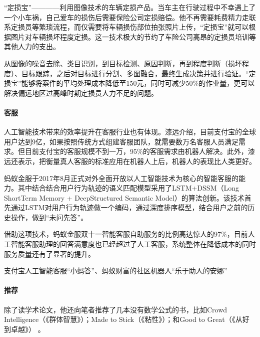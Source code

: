\documentclass[letterpaper,10pt,english]{sphinxmanual}
\begin{document}
“定损宝”————利用图像技术的车辆定损产品。当车主在行驶过程中不幸遇上了一个小车祸，自己爱车的损伤后需要保险公司定损赔偿。他不再需要耗费精力走联系定损员等繁琐流程，而仅需要将车辆损伤部位拍张照片上传，“定损宝”就可以根据图片对车辆损坏程度定损。这一技术极大的节约了车险公司高昂的定损员培训等其他人力的支出。

从图像的噪音去除、类目识别，到目标检测、原因判断，再到程度判断（损坏程度）、目标跟踪，之后对目标进行分割、多图融合，最终生成决策并进行验证。“定损宝”能够将案件的平均处理成本降低至150元，同时可减少50\%的作业量，更可以解决偏远地区过高峰时期定损员人力不足的问题。%
\begin{footnote}[1084]\sphinxAtStartFootnote
{}
%
\end{footnote}


\paragraph{客服}
\label{\detokenize{chapter_AI_expert/qi_yuan:id7}}
人工智能技术带来的效率提升在客服行业也有体现。漆远介绍，目前支付宝的全球用户达到9亿，如果按照传统方式组建客服团队，就需要数万名客服人员满足需求。但目前支付宝的客服规模不到一万，95\%的客服需求由机器人解决。此外，漆远还表示，把衡量真人客服的标准应用在机器人上后，机器人的表现比人类更好。

蚂蚁金服于2017年8月正式对外全面开放以人工智能技术为核心的智能客服的能力。其中结合结合用户行为轨迹的语义匹配模型采用了LSTM+DSSM（Long
Short\sphinxhyphen{}Term Memory + DeepStructured Semantic
Model）的算法创新。该技术首先通过LSTM对用户行为轨迹做一个编码，通过深度排序模型，结合用户之前的历史操作，做到“未问先答”。

借助这项技术，蚂蚁金服双十一智能客服自助服务的比例高达惊人的97\%，目前人工智能客服助理的回答满意度也已经超过了人工客服，系统整体在降低成本的同时服务质量还有了显著的提升。

支付宝人工智能客服“小蚂答”、蚂蚁财富的社区机器人“乐于助人的安娜”%
\begin{footnote}[1085]\sphinxAtStartFootnote
{}
%
\end{footnote}


\paragraph{推荐}
\label{\detokenize{chapter_AI_expert/qi_yuan:id8}}
除了读学术论文，他还向笔者推荐了几本没有数学公式的书，比如Crowd
Intelligence（《群体智慧》）；Made to Stick（《粘性》）；和Good to
Great（《从好到卓越》） 。
\end{document}
